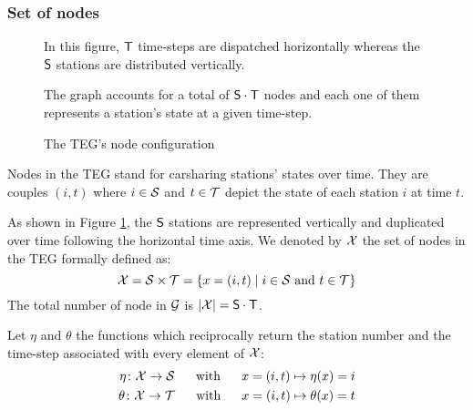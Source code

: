 \begin{bibunit}[ieeetr]

\subsubsection{Set of nodes}

\begin{figure}[t]
\begin{minipage}{.65\textwidth}
\begin{center}

\end{center}
\end{minipage}
\begin{minipage}{.3\textwidth}
In this figure, $\mathsf{T}$ time-steps are dispatched horizontally whereas the $\mathsf{S}$ stations are distributed vertically.

\bigskip
The graph accounts for a total of $\mathsf{S} \cdot \mathsf{T}$ nodes and each one of them represents a station's state at a given time-step.
\end{minipage}
\caption{The TEG's node configuration}
\label{fig:tegNodes}
\end{figure}

Nodes in the TEG stand for carsharing stations' states over time.
They are couples $(i,t)$ where $i \in \mathcal{S}$ and $t \in \mathcal{T}$ depict the state of each station $i$ at time $t$.
\medskip

As shown in Figure \ref{fig:tegNodes}, the $\mathsf{S}$ stations are represented vertically and duplicated over time following the horizontal time axis.
We denoted by $\mathcal{X}$ the set of nodes in the TEG formally defined as:
\begin{equation}
\mathcal{X} = \mathcal{S} \times \mathcal{T} = \{x=(i,t) \mid i \in \mathcal{S} \text{ and } t \in \mathcal{T}\}
\end{equation}
The total number of node in $\mathcal{G}$ is $|\mathcal{X}| = \mathsf{S} \cdot \mathsf{T}$.
\medskip

Let $\eta$ and $\theta$ the functions which reciprocally return the station number and the time-step associated with every element of $\mathcal{X}$:
\begin{align}
\eta \colon \mathcal{X}  \to \mathcal{S} \text{ ~~~~with~~~~ }  x = (i,t) \mapsto \eta(x) = i \\
\theta \colon \mathcal{X} \to \mathcal{T} \text{ ~~~~with~~~~ } x = (i,t) \mapsto \theta(x) = t
\end{align}


\end{bibunit}
